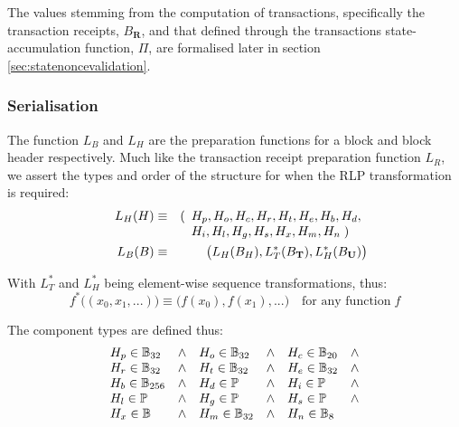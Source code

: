 \documentclass[9pt,oneside]{amsart}
\begin{document}
\begin{multicols}{2}
The values stemming from the computation of transactions, specifically the transaction receipts, $B_\mathbf{R}$, and that defined through the transactions state-accumulation function, $\Pi$, are formalised later in section \ref{sec:statenoncevalidation}.

\subsubsection{Serialisation}

The function $L_B$ and $L_H$ are the preparation functions for a block and block header respectively. Much like the transaction receipt preparation function $L_R$, we assert the types and order of the structure for when the RLP transformation is required:
\begin{eqnarray}
\quad L_H(H) & \equiv & (\begin{array}[t]{l}H_p, H_o, H_c, H_r, H_t, H_e, H_b, H_d,\\ H_i, H_l, H_g, H_s, H_x, H_m, H_n \; )\end{array} \\
\quad L_B(B) & \equiv & \big( L_H(B_H), L_T^*(B_\mathbf{T}), L_H^*(B_\mathbf{U}) \big)
\end{eqnarray}

With $L_T^*$ and $L_H^*$ being element-wise sequence transformations, thus:
\begin{equation}
f^*\big( (x_0, x_1, ...) \big) \equiv \big( f(x_0), f(x_1), ... \big) \quad \text{for any function} \; f
\end{equation}

The component types are defined thus:
\begin{equation}
\begin{array}[t]{lclclcl}
H_p \in \mathbb{B}_{32} & \wedge & H_o \in \mathbb{B}_{32} & \wedge & H_c \in \mathbb{B}_{20} & \wedge \\
H_r \in \mathbb{B}_{32} & \wedge & H_t \in \mathbb{B}_{32} & \wedge & H_e \in \mathbb{B}_{32} & \wedge \\
H_b \in \mathbb{B}_{256} & \wedge & H_d \in \mathbb{P} & \wedge & H_i \in \mathbb{P} & \wedge \\
H_l \in \mathbb{P} & \wedge & H_g \in \mathbb{P} & \wedge & H_s \in \mathbb{P} & \wedge \\
H_x \in \mathbb{B} & \wedge & H_m \in \mathbb{B}_{32} & \wedge & H_n \in \mathbb{B}_{8}
\end{array}
\end{equation}


\end{multicols}
\end{document}
